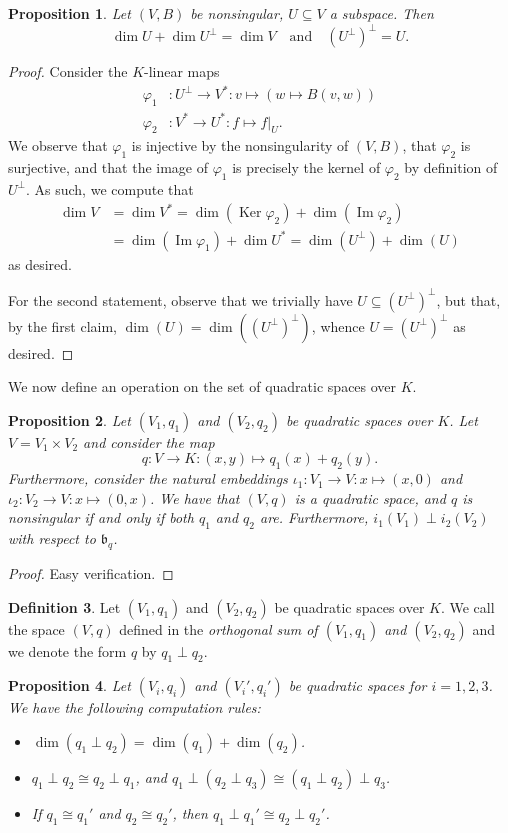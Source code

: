 \documentclass[12pt, leqno, british]{amsart}
\theoremstyle{definition}
\newtheorem{defi}{Definition}[subsection]
\theoremstyle{plain}
\newtheorem{prop}[defi]{Proposition}
\theoremstyle{remark}
\newcommand{\mf}{\mathfrak}
\DeclareMathOperator{\Ker}{Ker}
\DeclareMathOperator{\Img}{Im}
\begin{document}
\begin{prop}\label{P:dim-duality}
Let $(V, B)$ be nonsingular, $U \subseteq V$ a subspace. Then
$$ \dim U + \dim U^\perp = \dim V \quad\text{and}\quad (U^\perp)^\perp = U.$$
\end{prop}
\begin{proof}
Consider the $K$-linear maps
\begin{align*}
\varphi_1 &: U^\perp \to V^\ast : v \mapsto (w \mapsto B(v, w)) \\
\varphi_2 &: V^\ast \to U^\ast : f \mapsto f\vert_U.
\end{align*}
We observe that $\varphi_1$ is injective by the nonsingularity of $(V, B)$, that $\varphi_2$ is surjective, and that the image of $\varphi_1$ is precisely the kernel of $\varphi_2$ by definition of $U^\perp$.
As such, we compute that
\begin{align*}
\dim V &= \dim V^\ast = \dim(\Ker \varphi_2) + \dim(\Img \varphi_2) \\
&= \dim(\Img \varphi_1) + \dim U^\ast = \dim (U^\perp) + \dim(U)
\end{align*}
as desired.

For the second statement, observe that we trivially have $U \subseteq (U^\perp)^\perp$, but that, by the first claim, $\dim(U) = \dim((U^\perp)^\perp)$, whence $U = (U^\perp)^\perp$ as desired.
\end{proof}
We now define an operation on the set of quadratic spaces over $K$.
\begin{prop}\label{P:orth-sum}
Let $(V_1, q_1)$ and $(V_2, q_2)$ be quadratic spaces over $K$. Let $V = V_1 \times V_2$ and consider the map
$$ q : V \to K : (x, y) \mapsto q_1(x) + q_2(y). $$
Furthermore, consider the natural embeddings $\iota_1 : V_1 \to V : x \mapsto (x, 0)$ and $\iota_2 : V_2 \to V : x \mapsto (0, x)$.
We have that $(V, q)$ is a quadratic space, and $q$ is nonsingular if and only if both $q_1$ and $q_2$ are.
Furthermore, $i_1(V_1) \perp i_2(V_2)$ with respect to $\mf{b}_q$.
\end{prop}
\begin{proof}
Easy verification.
\end{proof}
\begin{defi}
Let $(V_1, q_1)$ and $(V_2, q_2)$ be quadratic spaces over $K$. We call the space $(V, q)$ defined in  the \emph{orthogonal sum of $(V_1, q_1)$ and $(V_2, q_2)$} and we denote the form $q$ by $q_1 \perp q_2$.
\end{defi}
\begin{prop}
Let $(V_i, q_i)$ and $(V_i', q_i')$ be quadratic spaces for $i = 1, 2, 3$. We have the following computation rules:
\begin{itemize}
\item $\dim(q_1 \perp q_2) = \dim(q_1) + \dim(q_2)$.
\item $q_1 \perp q_2 \cong q_2 \perp q_1$, and $q_1 \perp (q_2 \perp q_3) \cong (q_1 \perp q_2) \perp q_3$.
\item If $q_1 \cong q_1'$ and $q_2 \cong q_2'$, then $q_1 \perp q_1' \cong q_2 \perp q_2'$.
\end{itemize}
\end{prop}
\end{document}
